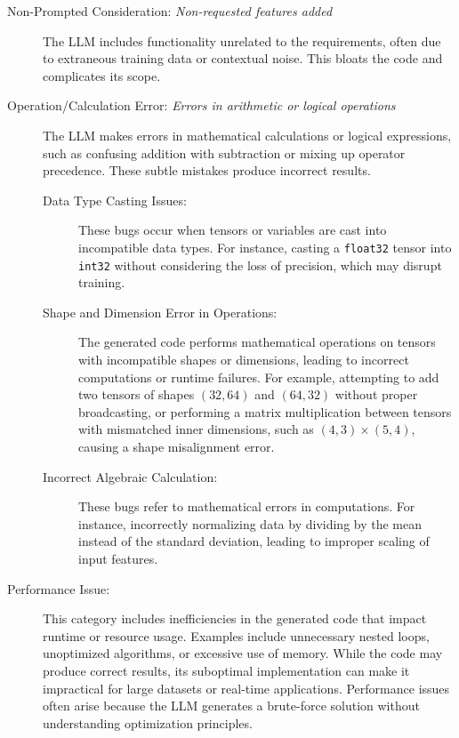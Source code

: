\begin{description}
\item[Non-Prompted Consideration: \textit{Non-requested features added}]
The LLM includes functionality unrelated to the requirements, often due to extraneous training data or contextual noise. This bloats the code and complicates its scope.

\item[Operation/Calculation Error: \textit{Errors in arithmetic or logical operations}]
The LLM makes errors in mathematical calculations or logical expressions, such as confusing addition with subtraction or mixing up operator precedence. These subtle mistakes produce incorrect results.

\begin{description}

    \item[Data Type Casting Issues:] These bugs occur when tensors or variables are cast into incompatible data types. For instance, casting a \texttt{float32} tensor into \texttt{int32} without considering the loss of precision, which may disrupt training.
    \item[Shape and Dimension Error in Operations:] The generated code performs mathematical operations on tensors with incompatible shapes or dimensions, leading to incorrect computations or runtime failures. For example, attempting to add two tensors of shapes $(32, 64)$ and $(64, 32)$ without proper broadcasting, or performing a matrix multiplication between tensors with mismatched inner dimensions, such as $(4, 3) \times (5, 4)$, causing a shape misalignment error.
    
    \item[Incorrect Algebraic Calculation:] These bugs refer to mathematical errors in computations. For instance, incorrectly normalizing data by dividing by the mean instead of the standard deviation, leading to improper scaling of input features.
    
    
\end{description}

\item[Performance Issue:]
This category includes inefficiencies in the generated code that impact runtime or resource usage. Examples include unnecessary nested loops, unoptimized algorithms, or excessive use of memory. While the code may produce correct results, its suboptimal implementation can make it impractical for large datasets or real-time applications. Performance issues often arise because the LLM generates a brute-force solution without understanding optimization principles.


\end{description}
